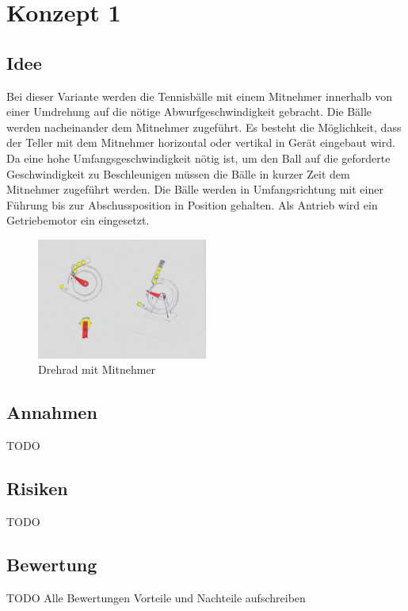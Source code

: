 \section{Konzept 1}

\subsection{Idee}
Bei dieser Variante werden die Tennisbälle mit einem Mitnehmer innerhalb von einer Umdrehung auf die nötige Abwurfgeschwindigkeit gebracht. Die Bälle werden nacheinander dem Mitnehmer zugeführt. Es besteht die Möglichkeit, dass der Teller mit dem Mitnehmer horizontal oder vertikal in Gerät eingebaut wird. Da eine hohe Umfangsgeschwindigkeit nötig ist, um den Ball auf die geforderte Geschwindigkeit zu Beschleunigen müssen die Bälle in kurzer Zeit dem Mitnehmer zugeführt werden. Die Bälle werden in Umfangsrichtung mit einer Führung bis zur Abschussposition in Position gehalten. Als Antrieb wird ein Getriebemotor ein eingesetzt.  
\begin{figure}[h!]
	\centering
	\includegraphics[width=0.5\textwidth]{../../fig/Drehrad_Mitnehmer.jpg}
	\caption{Drehrad mit Mitnehmer}
	\label{fig:mitnehmerrad_1}
\end{figure}
\subsection{Annahmen}
TODO

\subsection{Risiken}
TODO

\subsection{Bewertung}
TODO Alle Bewertungen
Vorteile und Nachteile aufschreiben